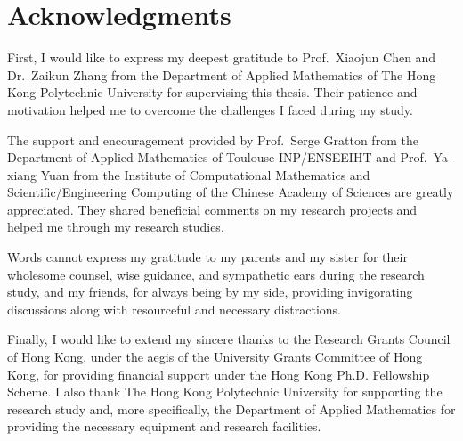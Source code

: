 %
%
%
\chapter*{Acknowledgments}
\label{ch:acknowledgments}

First, I would like to express my deepest gratitude to Prof.\ Xiaojun Chen and Dr.\ Zaikun Zhang from the Department of Applied Mathematics of The Hong Kong Polytechnic University for supervising this thesis.
Their patience and motivation helped me to overcome the challenges I faced during my study.

The support and encouragement provided by Prof.\ Serge Gratton from the Department of Applied Mathematics of Toulouse INP/ENSEEIHT and Prof.\ Ya-xiang Yuan from the Institute of Computational Mathematics and Scientific/Engineering Computing of the Chinese Academy of Sciences are greatly appreciated.
They shared beneficial comments on my research projects and helped me through my research studies.

Words cannot express my gratitude to my parents and my sister for their wholesome counsel, wise guidance, and sympathetic ears during the research study, and my friends, for always being by my side, providing invigorating discussions along with resourceful and necessary distractions.

Finally, I would like to extend my sincere thanks to the Research Grants Council of Hong Kong, under the aegis of the University Grants Committee of Hong Kong, for providing financial support under the Hong Kong Ph.D. Fellowship Scheme.
I also thank The Hong Kong Polytechnic University for supporting the research study and, more specifically, the Department of Applied Mathematics for providing the necessary equipment and research facilities.
